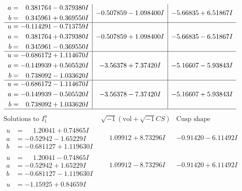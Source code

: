 \documentclass[1p]{elsarticle_modified}
\theoremstyle{definition}
\newcommand{\I}{\sqrt{-1}}
\begin{document}
$$\begin{array}{c|c|c}
\begin{aligned}
a &= \phantom{-}0.381764 - 0.379380 I \\
b &= \phantom{-}0.345961 + 0.369550 I\end{aligned}
 & -0.507859 - 1.098400 I & -5.66835 + 6.51867 I \\ \hline\begin{aligned}
u &= -0.114291 - 0.713759 I \\
a &= \phantom{-}0.381764 + 0.379380 I \\
b &= \phantom{-}0.345961 - 0.369550 I\end{aligned}
 & -0.507859 + 1.098400 I & -5.66835 - 6.51867 I \\ \hline\begin{aligned}
u &= -0.686172 + 1.114670 I \\
a &= -0.149939 + 0.505520 I \\
b &= \phantom{-}0.738092 - 1.033620 I\end{aligned}
 & -3.56378 + 7.37420 I & -5.16607 - 5.93843 I \\ \hline\begin{aligned}
u &= -0.686172 - 1.114670 I \\
a &= -0.149939 - 0.505520 I \\
b &= \phantom{-}0.738092 + 1.033620 I\end{aligned}
 & -3.56378 - 7.37420 I & -5.16607 + 5.93843 I\\
 \hline 
 \end{array}$$\newpage$$\begin{array}{c|c|c}  
\text{Solutions to }I^u_{1}& \I (\text{vol} + \sqrt{-1}CS) & \text{Cusp shape}\\
 \hline 
\begin{aligned}
u &= \phantom{-}1.20041 + 0.74865 I \\
a &= -0.52942 - 1.65229 I \\
b &= -0.681127 + 1.119630 I\end{aligned}
 & \phantom{-}1.09912 + 8.73296 I & -0.91420 - 6.11492 I \\ \hline\begin{aligned}
u &= \phantom{-}1.20041 - 0.74865 I \\
a &= -0.52942 + 1.65229 I \\
b &= -0.681127 - 1.119630 I\end{aligned}
 & \phantom{-}1.09912 - 8.73296 I & -0.91420 + 6.11492 I \\ \hline\begin{aligned}
u &= -1.15925 + 0.84659 I \\

\end{aligned}
\end{array}$$
\end{document}
